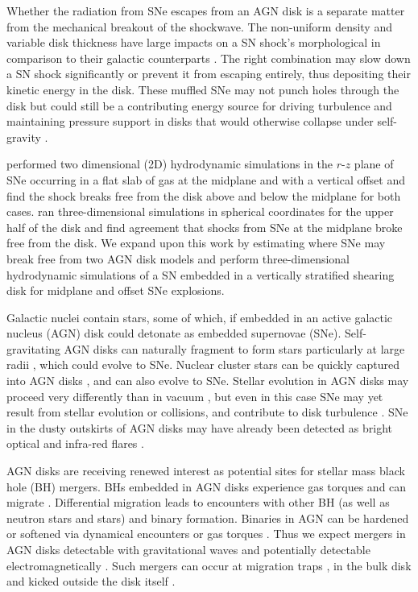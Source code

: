 Whether the radiation from SNe escapes from an AGN disk is a separate matter from the mechanical breakout of the shockwave.
The non-uniform density and variable disk thickness have large impacts on a SN shock's morphological in comparison to their galactic counterparts \citep{MacLowMcCray88}.
The right combination may slow down a SN shock significantly or prevent it from escaping entirely, thus depositing their kinetic energy in the disk.
These muffled SNe may not punch holes through the disk but could still be a contributing energy source for driving turbulence and maintaining pressure support in disks that would otherwise collapse under self-gravity \citep{Rozyczka+95,Moranchel+21}.

\citet{Grishin+21} performed two dimensional (2D) hydrodynamic simulations in the $r$-$z$ plane of SNe occurring in a flat slab of gas at the midplane and with a vertical offset and find the shock breaks free from the disk above and below the midplane for both cases.
\citet{Moranchel+21} ran three-dimensional simulations in spherical coordinates for the upper half of the disk and find agreement that shocks from SNe at the midplane broke free from the disk.
We expand upon this work by estimating where SNe may break free from two AGN disk models and perform three-dimensional hydrodynamic simulations of a SN embedded in a vertically stratified shearing disk for midplane and offset SNe explosions.

Galactic nuclei contain stars, some of which, if embedded in an active galactic nucleus (AGN) disk could detonate as embedded supernovae (SNe).
Self-gravitating AGN disks can naturally fragment to form stars particularly at large radii \citep[e.g.][]{Shlosman89,Collin08}, which could evolve to SNe.
Nuclear cluster stars can be quickly captured into AGN disks  \citep{Fabj20,MacLeod20}, and can also evolve to SNe.
Stellar evolution in AGN disks may proceed very differently than in vacuum \citep{Cantiello+21}, but even in this case SNe may yet result from stellar evolution \citep{Jermyn21} or collisions, and contribute to disk turbulence \citep{Moranchel+21}.
SNe in the dusty outskirts of AGN disks may have already been detected as bright optical and infra-red flares \citep[e.g.][]{Assef18}.

AGN disks are receiving renewed interest as potential sites for stellar mass black hole (BH) mergers. BHs embedded in AGN disks experience gas torques and can migrate \citep[e.g.][]{Syer91,Levin07,McKernan+12}. Differential migration leads to encounters with other BH (as well as neutron stars and stars) and binary formation. Binaries in AGN can be hardened or softened via dynamical encounters \citep[e.g.][]{Leigh+18,Samsing20,Wang21} or gas torques  \citep[e.g.][]{Tiede20,Derdzinski21,YapingLi21}. Thus we expect mergers in AGN disks detectable with gravitational waves \citep{McKernan+14,Bartos+17,Stone+17,Secunda+19} and potentially detectable electromagnetically \citep{McKernan+19,Perna21}. Such mergers can occur at migration traps \citep[e.g.][]{Lyra+10,Sandor+11,Horn+12,Bellovary2016,Yang+19,Secunda+20}, in the bulk disk \citep[e.g.][]{Tagawa20a,McK20a} and kicked outside the disk itself \citep{Tagawa20b}.

